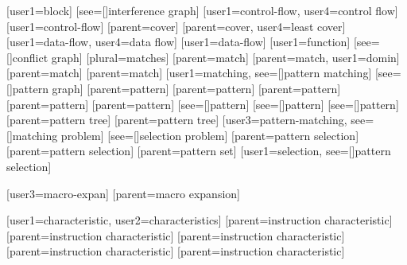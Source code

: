 
[user1={block}]
[see=[\seename]{interference graph}]
[user1={control-flow}, user4={control flow}]
[user1={control-flow}]
[parent={cover}]
[parent={cover}, user4={least cover}]
[user1={data-flow}, user4={data flow}]
[user1={data-flow}]
[user1={function}]
[see=[\seename]{conflict graph}]
[plural=matches]
[parent={match}]
[parent={match}, user1={domin}]
[parent={match}]
[parent={match}]
%
        [user1={matching}, see=[\seename]{pattern matching}]
[see=[\seename]{pattern graph}]
[parent={pattern}]
[parent={pattern}]
[parent={pattern}]
[parent={pattern}]
[parent={pattern}]
[see=[\seename]{pattern}]
[see=[\seename]{pattern}]
[see=[\seename]{pattern}]
[parent={pattern tree}]
[parent={pattern tree}]
%
        [user3={pattern-matching}, see=[\seename]{matching problem}]
[see=[\seename]{selection problem}]
[parent={pattern selection}]
[parent={pattern selection}]
[parent={pattern set}]
%
        [user1={selection}, see=[\seename]{pattern selection}]



[user3={macro-expan}]
[parent={macro expansion}]

%
        [user1={characteristic}, user2={characteristics}]
%
        [parent={instruction characteristic}]
%
        [parent={instruction characteristic}]
%
        [parent={instruction characteristic}]
%
        [parent={instruction characteristic}]
%
        [parent={instruction characteristic}]

